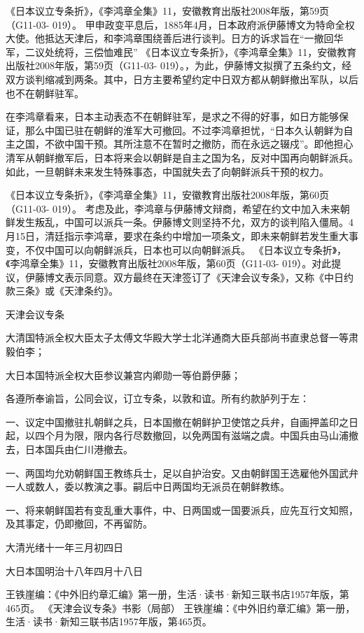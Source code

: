\documentclass[12pt,UTF8]{ctexbook}
\begin{document}
《日本议立专条折》，《李鸿章全集》11，安徽教育出版社2008年版，第59页（G11-03- 019）。
甲申政变平息后，1885年4月，日本政府派伊藤博文为特命全权大使。他抵达天津后，和李鸿章围绕善后进行谈判。日方的诉求旨在“一撤回华军，二议处统将，三偿恤难民” 《日本议立专条折》，《李鸿章全集》11，安徽教育出版社2008年版，第59页（G11-03- 019）。，为此，伊藤博文拟撰了五条约文，经双方谈判缩减到两条。其中，日方主要希望约定中日双方都从朝鲜撤出军队，以后也不在朝鲜驻军。

在李鸿章看来，日本主动表态不在朝鲜驻军，是求之不得的好事，如日方能够保证，那么中国已驻在朝鲜的淮军大可撤回。不过李鸿章担忧，“日本久认朝鲜为自主之国，不欲中国干预。其所注意不在暂时之撤防，而在永远之辍戍”。即他担心清军从朝鲜撤军后，日本将来会以朝鲜是自主之国为名，反对中国再向朝鲜派兵。如此，一旦朝鲜未来发生特殊事态，中国就失去了向朝鲜派兵干预的权力。

《日本议立专条折》，《李鸿章全集》11，安徽教育出版社2008年版，第60页（G11-03- 019）。
考虑及此，李鸿章与伊藤博文辩商，希望在约文中加入未来朝鲜发生叛乱，中国可以派兵一条。伊藤博文则坚持不允，双方的谈判陷入僵局。4月15日，清廷指示李鸿章，要求在条约中增加一项条文，即未来朝鲜若发生重大事变，不仅中国可以向朝鲜派兵，日本也可以向朝鲜派兵。 《日本议立专条折》，《李鸿章全集》11，安徽教育出版社2008年版，第60页（G11-03- 019）。对此提议，伊藤博文表示同意。双方最终在天津签订了《天津会议专条》，又称《中日约款三条》或《天津条约》。

天津会议专条

大清国特派全权大臣太子太傅文华殿大学士北洋通商大臣兵部尚书直隶总督一等肃毅伯李；

大日本国特派全权大臣参议兼宫内卿勋一等伯爵伊藤；

各遵所奉谕旨，公同会议，订立专条，以敦和谊。所有约款胪列于左：

一、议定中国撤驻扎朝鲜之兵，日本国撤在朝鲜护卫使馆之兵弁，自画押盖印之日起，以四个月为限，限内各行尽数撤回，以免两国有滋端之虞。中国兵由马山浦撤去，日本国兵由仁川港撤去。

一、两国均允劝朝鲜国王教练兵士，足以自护治安。又由朝鲜国王选雇他外国武弁一人或数人，委以教演之事。嗣后中日两国均无派员在朝鲜教练。

一、将来朝鲜国若有变乱重大事件，中、日两国或一国要派兵，应先互行文知照，及其事定，仍即撤回，不再留防。

大清光绪十一年三月初四日

大日本国明治十八年四月十八日


王铁崖编：《中外旧约章汇编》第一册，生活·读书·新知三联书店1957年版，第465页。
《天津会议专条》书影（局部） 王铁崖编：《中外旧约章汇编》第一册，生活·读书·新知三联书店1957年版，第465页。
\end{document}
